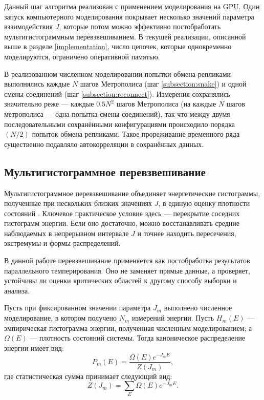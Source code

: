 Данный шаг алгоритма реализован с применением моделирования на GPU.  Один запуск компьютерного моделирования покрывает несколько значений параметра взаимодействия $J$, которые потом можно эффективно постобработать мультигистограммным перевзвешиванием. 
В текущей реализации, описанной выше в разделе \ref{implementation}, число цепочек, которые одновременно моделируются, ограничено оперативной памятью. 

В реализованном численном моделировании  попытки  обмена репликами выполнялись каждые $N$ шагов Метрополиса (шаг \ref{subsection:snake}) и одной смены соединений (шаг \ref{subsection:reconnect}). 
Измерения сохранялись значительно реже --- каждые $0.5N^2$ шагов Метрополиса (на каждые $N$ шагов метрополиса --- одна попытка смены соединений), так что между двумя последовательными сохранёнными конфигурациями происходило порядка $(N/2)$ попыток обмена репликами.
Такое прореживание временного ряда существенно подавляло автокорреляции в сохранённых данных. 

\subsection{Мультигистограммное перевзвешивание} 

Мультигистограммное перевзвешивание объединяет энергетические гистограммы, полученные при нескольких близких значениях $J$, в единую оценку плотности состояний \cite{PhysRevLett.61.2635,PhysRevLett.63.1195}. 
Ключевое практическое условие здесь --- перекрытие соседних гистограмм энергии. 
Если оно достаточно, можно восстанавливать средние наблюдаемых в непрерывном интервале $J$ и точнее находить пересечения, экстремумы и формы распределений.

В данной работе перевзвешивание применяется как постобработка результатов параллельного темперирования. 
Оно не заменяет прямые данные, а проверяет, устойчивы ли оценки критических областей к другому способу выборки и анализа.
 
Пусть при фиксированном значении параметра $J_m$ выполнено численное  моделирование, в котором получено $N_m$ измерений энергии. 
Пусть $H_m(E)$ --- эмпирическая  гистограмма энергии, полученная численным моделированием; а  $\Omega(E)$ --- плотность состояний системы. 
Тогда каноническое распределение энергии имеет вид:
\begin{equation}
	P_m(E)=\frac{\Omega(E)e^{-J_m E}}{Z(J_m)},
	\label{eq:canon_energy_dist}
\end{equation}
где статистическая сумма принимает следующий вид: 
\begin{equation}
	Z(J_m)=\sum_E \Omega(E)e^{-J_m E}  . 
	\label{eq:partition_from_dos}
\end{equation}
 
